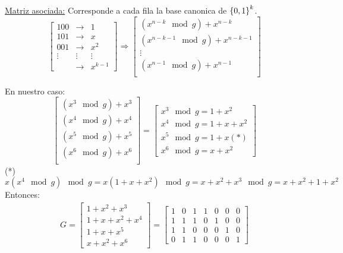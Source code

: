 \documentclass[12pt,a4paper]{article}
\begin{document}
\underline{Matriz asociada:} Corresponde a cada fila la base canonica de $\left\lbrace 0,1 \right\rbrace^{k}$.
\begin{equation*}
    \begin{bmatrix}
        100    & \to    & 1\\
        101    & \to    & x\\
        001    & \to    & x^{2}\\
        \vdots & \vdots & \vdots\\
               & \to    & x^{k-1}
    \end{bmatrix}
    \Rightarrow
    \begin{bmatrix}
        (x^{n-k} \mod g) + x^{n-k} \\
        (x^{n-k-1} \mod g) + x^{n-k-1} \\
        \vdots \\
        (x^{n-1} \mod g) + x^{n-1} \\
    \end{bmatrix}
\end{equation*}

En nuestro caso:
\begin{equation*}
    \begin{bmatrix}
        (x^{3} \mod g) + x^{3} \\
        (x^{4} \mod g) + x^{4} \\
        (x^{5} \mod g) + x^{5} \\
        (x^{6} \mod g) + x^{6} \\
    \end{bmatrix}
    = 
    \begin{bmatrix}
        x^{3} \mod g = 1 + x^{2}\\
        x^{4} \mod g = 1 + x + x^{2}\\
        x^{5} \mod g = 1+x(*)\\
        x^{6} \mod g = x+x^{2}
    \end{bmatrix}
\end{equation*}
(*) $x(x^{4} \mod g) \mod g = x(1+x+x^{2}) \mod g = x+x^{2}+x^{3} \mod g = x+x^{2}+1+x^{2}$
\medskip
Entonces:
\begin{align*}
    G =
    \begin{bmatrix}
        1+x^{2}+x^{3}\\
        1+x+x^{2}+x^{4}\\
        1+x+x^{5}\\
        x+x^{2}+x^{6}
    \end{bmatrix}
    =
    \begin{bmatrix}
        1 & 0 & 1 & 1 & 0 & 0 & 0\\
        1 & 1 & 1 & 0 & 1 & 0 & 0\\
        1 & 1 & 0 & 0 & 0 & 1 & 0\\
        0 & 1 & 1 & 0 & 0 & 0 & 1
    \end{bmatrix}
\end{align*}
\end{document}
